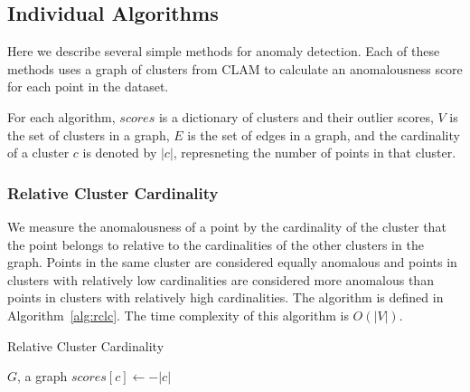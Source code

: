\subsection{Individual Algorithms}
\label{subsec:methods:individual-algorithms}

Here we describe several simple methods for anomaly detection.
Each of these methods uses a graph of clusters from CLAM to calculate an anomalousness score for each point in the dataset.

For each algorithm, $scores$ is a dictionary of clusters and their outlier scores,
$V$ is the set of clusters in a graph,
$E$ is the set of edges in a graph, and
the cardinality of a cluster $c$ is denoted by $|c|$, represneting the number of points in that cluster.

\subsubsection{Relative Cluster Cardinality}
We measure the anomalousness of a point by the cardinality of the cluster that the point belongs to relative to the cardinalities of the other clusters in the graph.
Points in the same cluster are considered equally anomalous and points in clusters with relatively low cardinalities are considered more anomalous than points in clusters with relatively high cardinalities. The algorithm is defined in Algorithm~\ref{alg:rclc}. The time complexity of this algorithm is $O(|V|)$.


\begin{algorithm}[h]
    \caption{Relative Cluster Cardinality}
    \label{alg:rclc}
\begin{algorithmic}[1]
    \REQUIRE $G$, a graph
    \STATE $scores[c] \gets -|c|$
    \ENDFOR
\end{algorithmic}
\end{algorithm}

